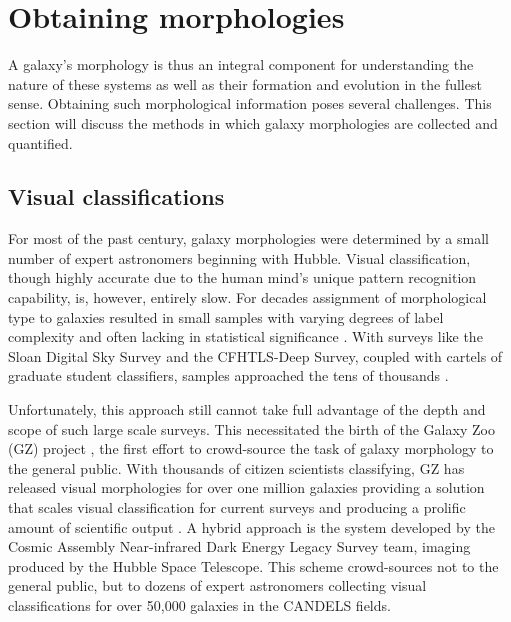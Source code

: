 \section{Obtaining morphologies}
A galaxy's morphology is thus an integral component for understanding the nature of these systems as well as their formation and evolution in the fullest sense. Obtaining such morphological information poses several challenges. This section will discuss the methods in which galaxy morphologies are collected and quantified. 

\subsection{Visual classifications}
For most of the past century, galaxy morphologies were determined by a small number of expert astronomers beginning with Hubble. Visual classification, though highly accurate due to the human mind's unique pattern recognition capability, is, however, entirely slow. For decades assignment of morphological type to galaxies resulted in small samples with varying degrees of label complexity and often lacking in statistical significance \citep{Hubble1936, Sandage1961, SandageTammann1981, deVaucouleurs1963, deVaucouleurs1991}. With surveys like the Sloan Digital Sky Survey \citep[SDSS,][]{Abazajian2003} and the CFHTLS-Deep Survey, coupled with cartels of graduate student classifiers, samples approached the tens of thousands \citep{Fukugita2007, Schawinski2007, NairAbraham2010}.

Unfortunately, this approach still cannot take full advantage of the depth and scope of such large scale surveys. This necessitated the birth of the Galaxy Zoo (GZ) project \citep{Lintott2008, Lintott2011, Willett2013, Willett2017, Simmons2017}, the first effort to crowd-source the task of galaxy morphology to the general public. With thousands of citizen scientists classifying, GZ has released visual morphologies for over one million galaxies providing a solution that scales visual classification for current surveys and producing a prolific amount of scientific output \citep[e.g.,][]{Land2008, Bamford2009, Darg2010, Schawinski2014, Galloway2015, Smethurst2016}.
A hybrid approach is the system developed by the Cosmic Assembly Near-infrared Dark Energy Legacy Survey \citep[CANDELS;][]{Grogin2011, Koekemoer2011} team, imaging produced by the Hubble Space Telescope. This scheme \citep{Kartaltepe2015} crowd-sources not to the general public, but to dozens of expert astronomers collecting visual classifications for over 50,000 galaxies in the CANDELS fields. 


